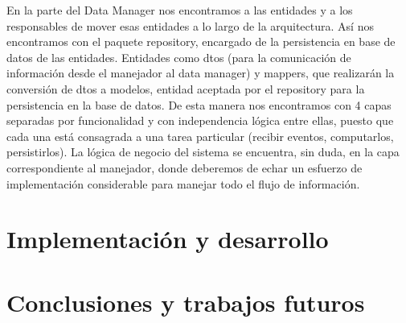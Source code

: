\documentclass[12pt,a4paper,oneside]{book} %
\begin{document}
\newline \newline
En la parte del Data Manager nos encontramos a las entidades y a los responsables de mover esas entidades a lo largo de la arquitectura. 
\newline \newline
Así nos encontramos con el paquete repository, encargado de la persistencia en base de datos de las entidades. Entidades como dtos (para la comunicación de información desde el manejador al data manager) y mappers, que realizarán la conversión de dtos a modelos, entidad aceptada por el repository para la persistencia en la base de datos. 
\newline \newline
De esta manera nos encontramos con 4 capas separadas por funcionalidad y con independencia lógica entre ellas, puesto que cada una está consagrada a una tarea particular (recibir eventos, computarlos, persistirlos). 
\newline \newline
La lógica de negocio del sistema se encuentra, sin duda, en la capa correspondiente al manejador, donde deberemos de echar un esfuerzo de implementación considerable para manejar todo el flujo de información. 


\chapter{Implementación y desarrollo}



\chapter{Conclusiones y trabajos futuros}






\pagebreak
\thispagestyle{empty}
\pagestyle{empty}


\end{document}
